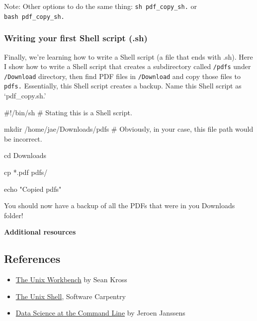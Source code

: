 \documentclass[
  letterpaper,
  DIV=11,
  numbers=noendperiod]{scrreprt}
\newenvironment{Shaded}{\begin{snugshade}}{\end{snugshade}}
\newcommand{\BuiltInTok}[1]{\textcolor[rgb]{0.00,0.23,0.31}{#1}}
\newcommand{\CommentTok}[1]{\textcolor[rgb]{0.37,0.37,0.37}{#1}}
\newcommand{\FunctionTok}[1]{\textcolor[rgb]{0.28,0.35,0.67}{#1}}
\newcommand{\NormalTok}[1]{\textcolor[rgb]{0.00,0.23,0.31}{#1}}
\newcommand{\PreprocessorTok}[1]{\textcolor[rgb]{0.68,0.00,0.00}{#1}}
\newcommand{\StringTok}[1]{\textcolor[rgb]{0.13,0.47,0.30}{#1}}
\begin{document}
Note: Other options to do the same thing: \texttt{sh\ pdf\_copy\_sh.} or
\texttt{bash\ pdf\_copy\_sh.}

\hypertarget{writing-your-first-shell-script-.sh}{%
\subsubsection*{Writing your first Shell script
(.sh)}\label{writing-your-first-shell-script-.sh}}

Finally, we're learning how to write a Shell script (a file that ends
with .sh). Here I show how to write a Shell script that creates a
subdirectory called \texttt{/pdfs} under \texttt{/Download} directory,
then find PDF files in \texttt{/Download} and copy those files to
\texttt{pdfs.} Essentially, this Shell script creates a backup. Name
this Shell script as `pdf\_copy.sh.'

\begin{Shaded}
\begin{Highlighting}[]

\CommentTok{\#!/bin/sh \# Stating this is a Shell script. }

\FunctionTok{mkdir}\NormalTok{ /home/jae/Downloads/pdfs }\CommentTok{\# Obviously, in your case, this file path would be incorrect.}

\BuiltInTok{cd}\NormalTok{ Downloads}

\FunctionTok{cp} \PreprocessorTok{*}\NormalTok{.pdf pdfs/ }

\BuiltInTok{echo} \StringTok{"Copied pdfs"}
\end{Highlighting}
\end{Shaded}

You should now have a backup of all the PDFs that were in you Downloads
folder!

\textbf{Additional resources}

\hypertarget{references}{%
\subsection*{References}\label{references}}

\begin{itemize}
\item
  \href{https://seankross.com/the-unix-workbench/}{The Unix Workbench}
  by Sean Kross
\item
  \href{http://swcarpentry.GitHub.io/shell-novice/}{The Unix Shell},
  Software Carpentry
\item
  \href{https://www.datascienceatthecommandline.com/1e/}{Data Science at
  the Command Line} by Jeroen Janssens
\end{itemize}
\end{document}

